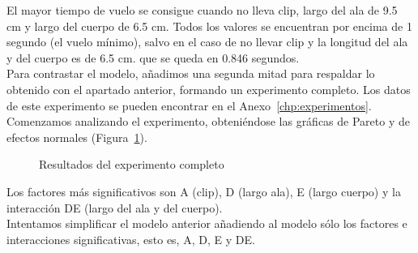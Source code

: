 \documentclass[12pt,a4paper,twoside,openright,titlepage,final]{article}
\begin{document}
El mayor tiempo de vuelo se consigue cuando no lleva clip, largo del ala de 9.5 cm y largo del cuerpo de 6.5 cm. Todos los valores se encuentran por encima de 1 segundo (el vuelo mínimo), salvo en el caso de no llevar clip y la longitud del ala y del cuerpo es de 6.5 cm. que se queda en 0.846 segundos.\\

Para contrastar el modelo, añadimos una segunda mitad para respaldar lo obtenido con el apartado anterior, formando un experimento completo.  Los datos de este experimento se pueden encontrar en el Anexo~\ref{chp:experimentos}.\\

Comenzamos analizando el experimento, obteniéndose las gráficas de Pareto y de efectos normales (Figura~\ref{fig:resultado_experimento_completo_1}).\\

\begin{figure}[htbp!]
	\centering
	\caption{Resultados del experimento completo} \label{fig:resultado_experimento_completo_1}
\end{figure}

Los factores más significativos son A (clip), D (largo ala), E (largo cuerpo) y la interacción DE (largo del ala y del cuerpo).\\

Intentamos simplificar el modelo anterior añadiendo al modelo sólo los factores e interacciones significativas, esto es, A, D, E y DE.\\
\end{document}
